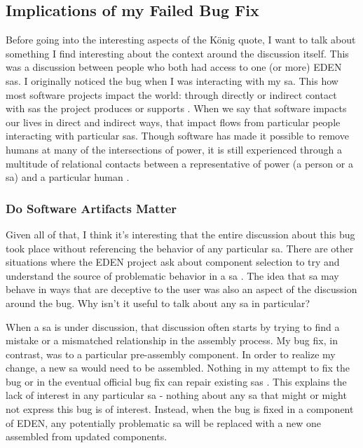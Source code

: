 \documentclass[a4paper,man,natbib,floatsintext]{apa6}
\begin{document}
   \subsection{Implications of my Failed Bug Fix}
   Before going into the interesting aspects of the König quote, I want to talk about something I find interesting about the context around the discussion itself. This was a discussion between people who both had access to one (or more) \gls{EDEN} \glspl{sa}. I originally noticed the bug when I was interacting with my \gls{sa}. This how most software projects impact the world: through directly or indirect contact with \glspl{sa} the project produces or supports \citep{Kitchin2011-af}. When we say that software impacts our lives in direct and indirect ways, that impact flows from particular people interacting with particular \glspl{sa}. Though software has made it possible to remove humans at many of the intersections of power, it is still experienced through a multitude of relational contacts between a representative of power (a person or a \gls{sa}) and a particular human \citet{Cheney-Lippold2018-lw,Deluze1995-eo}. 

   \subsubsection{Do Software Artifacts Matter}
   Given all of that, I think it's interesting that the entire discussion about this bug took place without referencing the behavior of any particular \gls{sa}. There are other situations where the \gls{EDEN} project ask about component selection to try and understand the source of problematic behavior in a \gls{sa} \citep{Trendspotter2020-ps}. The idea that \gls{sa} may behave in ways that are deceptive to the user was also an aspect of the discussion around the bug. Why isn't it useful to talk about any \gls{sa} in particular?

   When a \gls{sa} is under discussion, that discussion often starts by trying to find a mistake or a mismatched relationship in the assembly process. My bug fix, in contrast, was to a particular pre-assembly component. In order to realize my change, a new \gls{sa} would need to be assembled. Nothing in my attempt to fix the bug or in the eventual official bug fix can repair existing \glspl{sa} \citep{Konig2020-yx,Konig2020-ey}. This explains the lack of interest in any particular \gls{sa} - nothing about any \gls{sa} that might or might not express this bug is of interest. Instead, when the bug is fixed in a component of \gls{EDEN}, any potentially problematic \gls{sa} will be replaced with a new one assembled from updated components.
\end{document}
